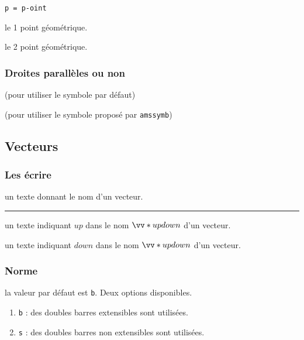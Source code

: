 \documentclass[12pt,a4paper]{article}
\theoremstyle{definition}
\newcommand\separation{
	\medskip
	\hfill\rule{0.5\textwidth}{0.75pt}\hfill
	\medskip
}
\newcommand\extraspace{
	\vspace{0.25em}
}
\newcommand\mwhyprefix[2]{%
	\texttt{#1 = #1-#2}%
}
\begin{document}
\extraspace


  \hfill \mwhyprefix{p}{oint}

 le 1\ier{} point géométrique.

 le 2\ieme{} point géométrique.




\subsubsection{Droites parallèles ou non}





\extraspace

 (pour utiliser le symbole par défaut)

 (pour utiliser le symbole proposé par \verb+amssymb+)


\subsection{Vecteurs}

\subsubsection{Les écrire}




\IDarg{} un texte donnant le nom d'un vecteur.


\separation



 un texte indiquant $up$ dans le nom $\vect*{up}{down}$ d'un vecteur.

 un texte indiquant $down$ dans le nom $\vect*{up}{down}$ d'un vecteur.


\subsubsection{Norme}




\IDoption{} la valeur par défaut est \verb+b+. Deux options disponibles.
\begin{enumerate}
	\item \verb+b+ : des doubles barres extensibles sont utilisées.

	\item \verb+s+ : des doubles barres non extensibles sont utilisées.
\end{enumerate}
\end{document}
